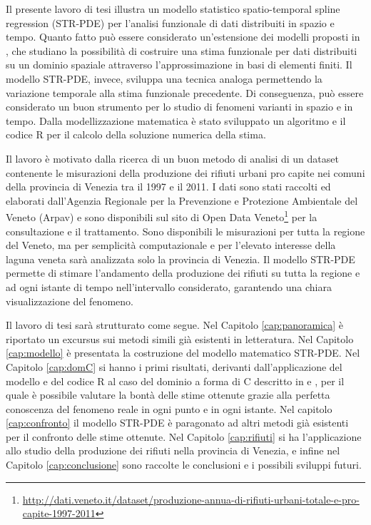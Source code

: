 \documentclass[a4paper,11pt,twoside,openright]{book}							%
\begin{document}
Il presente lavoro di tesi illustra un modello statistico spatio-temporal spline regression (STR-PDE) per l'analisi funzionale di dati distribuiti in spazio e tempo. Quanto fatto può essere considerato un'estensione dei modelli proposti in \cite{art:sangalli}, che studiano la possibilità di costruire una stima funzionale per dati distribuiti su un dominio spaziale attraverso l'approssimazione in basi di elementi finiti. Il modello STR-PDE, invece, sviluppa una tecnica analoga permettendo la variazione temporale alla stima funzionale precedente. Di conseguenza, può essere considerato un buon strumento per lo studio di fenomeni varianti in spazio e in tempo. Dalla modellizzazione matematica è stato sviluppato un algoritmo e il codice R per il calcolo della soluzione numerica della stima.

Il lavoro è motivato dalla ricerca di un buon metodo di analisi di un dataset contenente le misurazioni della produzione dei rifiuti urbani pro capite nei comuni della provincia di Venezia tra il 1997 e il 2011. I dati sono stati raccolti ed elaborati dall'Agenzia Regionale per la Prevenzione e Protezione Ambientale del Veneto (Arpav) e sono disponibili sul sito di Open Data Veneto\footnote{\href{http://dati.veneto.it/dataset/produzione-annua-di-rifiuti-urbani-totale-e-pro-capite-1997-2011}{http://dati.veneto.it/dataset/produzione-annua-di-rifiuti-urbani-totale-e-pro-capite-1997-2011}} per la consultazione e il trattamento. Sono disponibili le misurazioni per tutta la regione del Veneto, ma per semplicità computazionale e per l'elevato interesse della laguna veneta sarà analizzata solo la provincia di Venezia. Il modello STR-PDE permette di stimare l'andamento della produzione dei rifiuti su tutta la regione e ad ogni istante di tempo nell'intervallo considerato, garantendo una chiara visualizzazione del fenomeno.

Il lavoro di tesi sarà strutturato come segue. Nel Capitolo \ref{cap:panoramica} è riportato un excursus sui metodi simili già esistenti in letteratura. Nel Capitolo \ref{cap:modello} è presentata la costruzione del modello matematico STR-PDE. Nel Capitolo \ref{cap:domC} si hanno i primi risultati, derivanti dall'applicazione del modello e del codice R al caso del dominio a forma di C descritto in \cite{art:ramsay} e \cite{art:wood}, per il quale è possibile valutare la bontà delle stime ottenute grazie alla perfetta conoscenza del fenomeno reale in ogni punto e in ogni istante. Nel capitolo \ref{cap:confronto} il modello STR-PDE è paragonato ad altri metodi già esistenti per il confronto delle stime ottenute. Nel Capitolo \ref{cap:rifiuti} si ha l'applicazione allo studio della produzione dei rifiuti nella provincia di Venezia, e infine nel Capitolo \ref{cap:conclusione} sono raccolte le conclusioni e i possibili sviluppi futuri.
\end{document}
